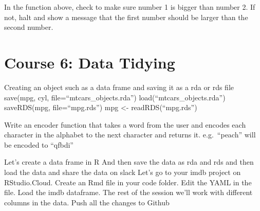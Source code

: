 \documentclass[]{book}
\newenvironment{Shaded}{\begin{snugshade}}{\end{snugshade}}
\newcommand{\ControlFlowTok}[1]{\textcolor[rgb]{0.13,0.29,0.53}{\textbf{#1}}}
\newcommand{\DataTypeTok}[1]{\textcolor[rgb]{0.13,0.29,0.53}{#1}}
\newcommand{\DecValTok}[1]{\textcolor[rgb]{0.00,0.00,0.81}{#1}}
\newcommand{\KeywordTok}[1]{\textcolor[rgb]{0.13,0.29,0.53}{\textbf{#1}}}
\newcommand{\NormalTok}[1]{#1}
\newcommand{\OperatorTok}[1]{\textcolor[rgb]{0.81,0.36,0.00}{\textbf{#1}}}
\newcommand{\StringTok}[1]{\textcolor[rgb]{0.31,0.60,0.02}{#1}}
\begin{document}
In the function above, check to make sure number 1 is bigger than number 2. If not, halt and show a message that the first number should be larger than the second number.

\begin{Shaded}
\end{Shaded}

\hypertarget{tidying}{%
\chapter*{Course 6: Data Tidying}\label{tidying}}

Creating an object such as a data frame and saving it as a rda or rds file
save(mpg, cyl, file=``mtcars\_objects.rda'')
load(``mtcars\_objects.rda'')
saveRDS(mpg, file=``mpg.rds'')
mpg \textless{}- readRDS(``mpg.rds'')

Write an encoder function that takes a word from the user and encodes each character in the alphabet to the next character and returns it. e.g.~``peach'' will be encoded to ``qfbdi''

Let's create a data frame in R
And then save the data as rda and rds and then load the data and share the data on slack
Let's go to your imdb project on RStudio.Cloud. Create an Rmd file in your code folder.
Edit the YAML in the file.
Load the imdb dataframe. The rest of the session we'll work with different columns in the data.
Push all the changes to Github
\end{document}
